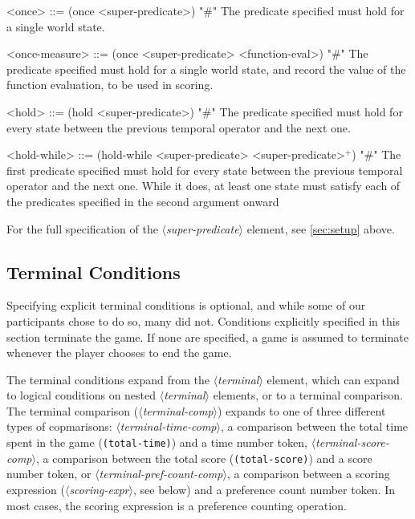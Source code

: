 \documentclass{article}
\newcommand{\dsl}[1]{{\it $\langle$#1$\rangle$}}
\begin{document}
\begin{grammar}
<once> ::= (once <super-predicate>) "#" The predicate specified must hold for a single world state.

<once-measure> ::= (once <super-predicate> <function-eval>) "#" The predicate specified must hold for a single world state, and record the value of the function evaluation, to be used in scoring.

<hold> ::= (hold <super-predicate>) "#" The predicate specified must hold for every state between the previous temporal operator and the next one.

<hold-while> ::= (hold-while <super-predicate> <super-predicate>$^+$) "#" The first predicate specified must hold for every state between the previous temporal operator and the next one. While it does, at least one state must satisfy each of the predicates specified in the second argument onward



\end{grammar}
For the full specification of the \dsl{super-predicate} element, see \autoref{sec:setup} above.



\subsection{Terminal Conditions} \label{sec:terminal}
Specifying explicit terminal conditions is optional, and while some of our participants chose to do so, many did not.
Conditions explicitly specified in this section terminate the game.
If none are specified, a game is assumed to terminate whenever the player chooses to end the game.

The terminal conditions expand from the \dsl{terminal} element, which can expand to logical conditions on nested \dsl{terminal} elements, or to a terminal comparison.
The terminal comparison (\dsl{terminal-comp}) expands to one of three different types of copmarisons: \dsl{terminal-time-comp}, a comparison between the total time spent in the game (\lstinline{(total-time)}) and a time number token, \dsl{terminal-score-comp}, a comparison between the total score (\lstinline{(total-score)}) and a score number token, or \dsl{terminal-pref-count-comp}, a comparison between a scoring expression (\dsl{scoring-expr}, see below) and a preference count number token.
In most cases, the scoring expression is a preference counting operation.
\end{document}
